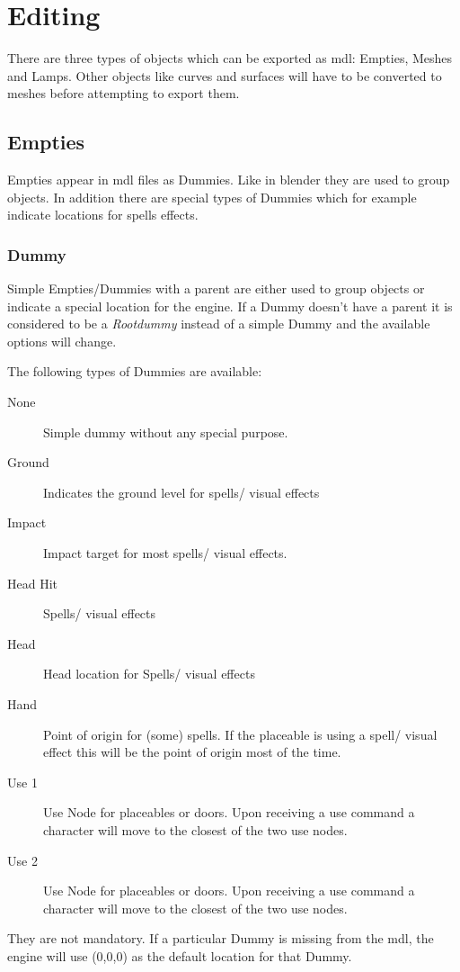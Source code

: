 \section{Editing}
There are three types of objects which can be exported as mdl: Empties,
Meshes and Lamps. Other objects like curves and surfaces will have to be
converted to meshes before attempting to export them.

\subsection{Empties}
Empties appear in mdl files as Dummies. Like in blender they are used to group
objects. In addition there are special types of Dummies which for
example indicate locations for spells effects.

\subsubsection{Dummy}
Simple Empties/Dummies with a parent are either used to group objects or
indicate a special location for the engine. If a Dummy doesn't have a
parent it is considered to be a {\textit{Rootdummy}} instead of a simple Dummy
and the available options will change.

The following types of Dummies are available:
\begin{description}
    \item[None] Simple dummy without any special purpose.
    \item[Ground] Indicates the ground level for spells/ visual effects
    \item[Impact] Impact target for most spells/ visual effects.
    \item[Head Hit] Spells/ visual effects
    \item[Head] Head location for Spells/ visual effects
    \item[Hand] Point of origin for (some) spells. If the placeable is using a spell/ visual effect this will be the point of origin most of the time.
    \item[Use 1] Use Node for placeables or doors. Upon receiving a use command a character will move to the closest of the two use nodes.
    \item[Use 2] Use Node for placeables or doors. Upon receiving a use command a character will move to the closest of the two use nodes.
\end{description}
They are not mandatory. If a particular Dummy is missing from the mdl, the
engine will use (0,0,0) as the default location for that Dummy.

